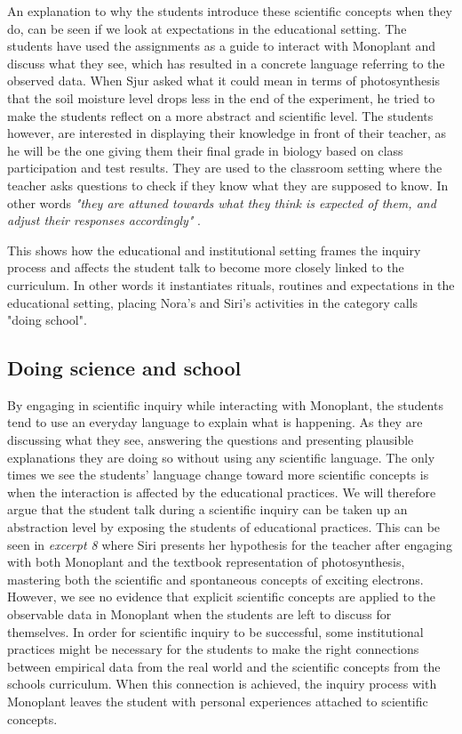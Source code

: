 An explanation to why the students introduce these scientific concepts when they do, can be seen if we look at expectations in the educational setting. The students have used the assignments as a guide to interact with Monoplant and discuss what they see, which has resulted in a concrete language referring to the observed data. When Sjur asked what it could mean in terms of photosynthesis that the soil moisture level drops less in the end of the experiment, he tried to make the students reflect on a more abstract and scientific level. The students however, are interested in displaying their knowledge in front of their teacher, as he will be the one giving them their final grade in biology based on class participation and test results. They are used to the classroom setting where the teacher asks questions to check if they know what they are supposed to know. In other words \emph{"they are attuned towards what they think is expected of them, and adjust their responses accordingly"} \citep{furberg2009socio}. 

This shows how the educational and institutional setting frames the inquiry process and affects the student talk to become more closely linked to the curriculum. In other words it instantiates rituals, routines and expectations in the educational setting, placing Nora's and Siri's activities in the category \citet{jimenez2000doing} calls "doing school". 


\subsection{Doing science and school}
By engaging in scientific inquiry while interacting with Monoplant, the students tend to use an everyday language to explain what is happening. As they are discussing what they see, answering the questions and presenting plausible explanations they are doing so without using any scientific language. The only times we see the students' language change toward more scientific concepts is when the interaction is affected by the educational practices. We will therefore argue that the student talk during a scientific inquiry can be taken up an abstraction level by exposing the students of educational practices. This can be seen in \emph{excerpt 8} where Siri presents her hypothesis for the teacher after engaging with both Monoplant and the textbook representation of photosynthesis, mastering both the scientific and spontaneous concepts of exciting electrons. However, we see no evidence that explicit scientific concepts are applied to the observable data in Monoplant when the students are left to discuss for themselves. 
In order for scientific inquiry to be successful, some institutional practices might be necessary for the students to make the right connections between empirical data from the real world and the scientific concepts from the schools curriculum. When this connection is achieved, the inquiry process with Monoplant leaves the student with personal experiences attached to scientific concepts. 

 


